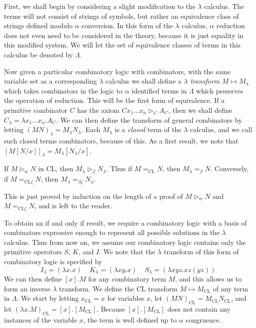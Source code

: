First, we shall begin by considering a slight modification to the $\lambda$ calculus. The terms will not consist of strings of symbols, but rather an equivalence class of strings defined modulo $\alpha$ conversion. In this form of the $\lambda$ calculus, $\alpha$ reduction does not even need to be considered in the theory, because it is just equality in this modified system. We will let the set of equivalence classes of terms in this calculus be denoted by $\Lambda$.

Now given a particular combinatory logic with combinators, with the same variable set as a corresponding $\lambda$ calculus we shall define a \emph{$\lambda$ transform} $M \mapsto M_\lambda$ which takes combinators in the logic to $\alpha$ identified terms in $\Lambda$ which preserves the operation of reduction. This will be the first form of equivalence. If a primitive combinator $C$ has the axiom $Cx_1 \dots x_n \rhd_C A_C$, then we shall define $C_\lambda = \lambda x_1 \dots x_n. A_C$. We can then define the transform of general combinators by letting $(MN)_\lambda = M_\lambda N_\lambda$. Each $M_\lambda$ is a \emph{closed} term of the $\lambda$ calculus, and we call such closed terms combinators, because of this. As a first result, we note that $[M[N/x]]_\lambda = M_\lambda [N_\lambda/x]$.

\begin{lemma}
    If $M \rhd_w N$ in $\text{CL}$, then $M_\lambda \rhd_\beta N_\lambda$. Thus if $M =_{\text{CL}} N$, then $M_\lambda =_\beta N$. Conversely, if $M =_{\text{CL} \zeta} N$, then $M_\lambda =_{\beta \zeta} N_\lambda$.
\end{lemma}

This is just proved by induction on the length of a proof of $M \rhd_w N$ and $M =_{\text{CL} \zeta} N$, and is left to the reader.

To obtain an if and only if result, we require a combinatory logic with a basis of combinators expressive enough to represent all possible solutions in the $\lambda$ calculus. Thus from now on, we assume our combinatory logic contains only the primitive operators $S$, $K$, and $I$. We note that the $\lambda$ transform of this form of combinatory logic is specified by
%
\[ I_\lambda = (\lambda x.x)\ \ \ \ \ K_\lambda = (\lambda xy.x)\ \ \ \ \ S_\lambda = (\lambda xyz.xz(yz)) \]
%
We can then define $[x].M$ for any combinatory term $M$, and this allows us to form an inverse $\lambda$ transform. We define the $\text{CL}$ transform $M \mapsto M_{\text{CL}}$ of any term in $\Lambda$. We start by letting $x_{\text{CL}} = x$ for variables $x$, let $(MN)_{\text{CL}} = M_{\text{CL}} N_{\text{CL}}$, and let $(\lambda x.M)_{\text{CL}} = [x].[M_{\text{CL}}]$. Because $[x].[M_{\text{CL}}]$ does not contain any instances of the variable $x$, the term is well defined up to $\alpha$ congruence.

